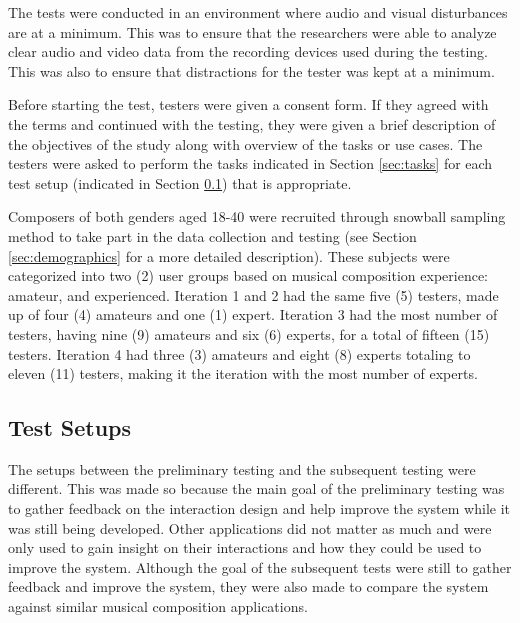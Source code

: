 		The tests were conducted in an environment where audio and visual disturbances are at a minimum. This was to ensure that the researchers were able to analyze clear audio and video data from the recording devices used during the testing. This was also to ensure that distractions for the tester was kept at a minimum.


		Before starting the test, testers were given a consent form. If they agreed with the terms and continued with the testing, they were given a brief description of the objectives of the study along with overview of the tasks or use cases. The testers were asked to perform the tasks indicated in Section \ref{sec:tasks} for each test setup (indicated in Section \ref{sec:test-setups}) that is appropriate. 
		
		Composers of both genders aged 18-40 were recruited through snowball sampling method to take part in the data collection and testing (see Section \ref{sec:demographics} for a more detailed description). These subjects were categorized into two (2) user groups based on musical composition experience: amateur, and experienced. Iteration 1 and 2 had the same five (5) testers, made up of four (4) amateurs and one (1) expert. Iteration 3 had the most number of testers, having nine (9) amateurs and six (6) experts, for a total of fifteen (15) testers. Iteration 4 had three (3) amateurs and eight (8) experts totaling to eleven (11) testers, making it the iteration with the most number of experts. 

		\subsection{Test Setups}
		\label{sec:test-setups}

			The setups between the preliminary testing and the subsequent testing were different. This was made so because the main goal of the preliminary testing was to gather feedback on the interaction design and help improve the system while it was still being developed. Other applications did not matter as much and were only used to gain insight on their interactions and how they could be used to improve the system. Although the goal of the subsequent tests were still to gather feedback and improve the system, they were also made to compare the system against similar musical composition applications. 

